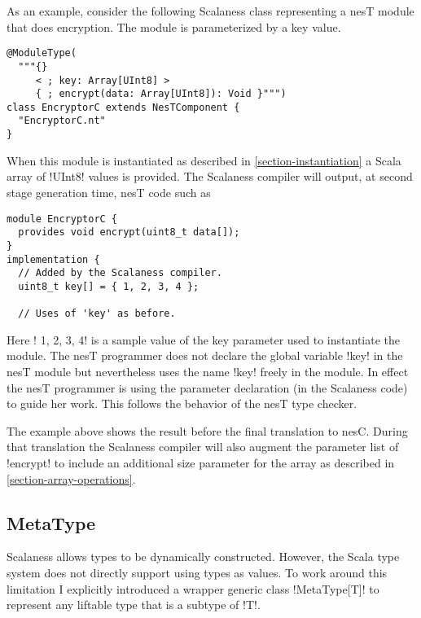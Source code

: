 As an example, consider the following Scalaness class representing a nesT module that does
encryption. The module is parameterized by a key value.

\singlespace
\vspace{1.0ex}
\begin{lstlisting}[language=scalaness]
@ModuleType(
  """{}
     < ; key: Array[UInt8] >
     { ; encrypt(data: Array[UInt8]): Void }""")
class EncryptorC extends NesTComponent {
  "EncryptorC.nt"
}
\end{lstlisting}
\vspace{1.0ex}
\primaryspacing

When this module is instantiated as described in \autoref{section-instantiation} a Scala array
of !UInt8! values is provided. The Scalaness compiler will output, at second stage generation
time, nesT code such as

\singlespace
\vspace{1.0ex}
\begin{lstlisting}[language=nesC]
module EncryptorC {
  provides void encrypt(uint8_t data[]);
}
implementation {
  // Added by the Scalaness compiler.
  uint8_t key[] = { 1, 2, 3, 4 };

  // Uses of 'key' as before.
\end{lstlisting}
\vspace{1.0ex}
\primaryspacing

Here !{ 1, 2, 3, 4}! is a sample value of the key parameter used to instantiate the module. The
nesT programmer does not declare the global variable !key! in the nesT module but nevertheless
uses the name !key! freely in the module. In effect the nesT programmer is using the parameter
declaration (in the Scalaness code) to guide her work. This follows the behavior of the nesT
type checker.

The example above shows the result before the final translation to nesC. During that translation
the Scalaness compiler will also augment the parameter list of !encrypt! to include an
additional size parameter for the array as described in \autoref{section-array-operations}.


\subsection{MetaType}
\label{section-metatype}

Scalaness allows types to be dynamically constructed. However, the Scala type system does not
directly support using types as values. To work around this limitation I explicitly introduced a
wrapper generic class !MetaType[T]! to represent any liftable type that is a subtype of !T!.

